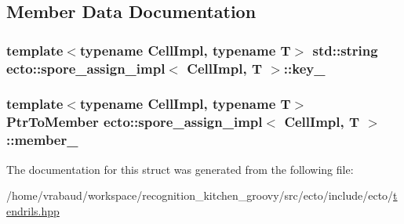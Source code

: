 \subsection{\-Member \-Data \-Documentation}
\hypertarget{structecto_1_1spore__assign__impl_a961946cb7f186c6a836467363b747915}{
\subsubsection[{key\-\_\-}]{\setlength{\rightskip}{0pt plus 5cm}template$<$typename \-Cell\-Impl, typename \-T$>$ std\-::string {\bf ecto\-::spore\-\_\-assign\-\_\-impl}$<$ \-Cell\-Impl, \-T $>$\-::{\bf key\-\_\-}}}\label{structecto_1_1spore__assign__impl_a961946cb7f186c6a836467363b747915}
\hypertarget{structecto_1_1spore__assign__impl_a8d8ead313308f3ecfb7d5f2ed4fbe975}{
\subsubsection[{member\-\_\-}]{\setlength{\rightskip}{0pt plus 5cm}template$<$typename \-Cell\-Impl, typename \-T$>$ {\bf \-Ptr\-To\-Member} {\bf ecto\-::spore\-\_\-assign\-\_\-impl}$<$ \-Cell\-Impl, \-T $>$\-::{\bf member\-\_\-}}}\label{structecto_1_1spore__assign__impl_a8d8ead313308f3ecfb7d5f2ed4fbe975}


\-The documentation for this struct was generated from the following file\-:\begin{DoxyCompactItemize}
\item 
/home/vrabaud/workspace/recognition\-\_\-kitchen\-\_\-groovy/src/ecto/include/ecto/\hyperlink{tendrils_8hpp}{tendrils.\-hpp}\end{DoxyCompactItemize}
